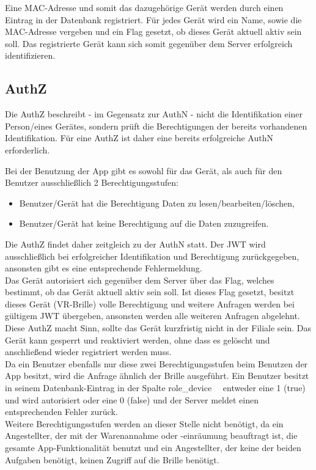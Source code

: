 Eine \ac{MAC}-Adresse und somit das dazugehörige Gerät werden durch einen Eintrag in der Datenbank registriert. Für jedes Gerät wird ein Name, sowie die \ac{MAC}-Adresse vergeben und ein Flag gesetzt, ob dieses Gerät aktuell aktiv sein soll. Das registrierte Gerät kann sich somit gegenüber dem Server erfolgreich identifizieren.

\subsection{\acf{AuthZ}}
Die \acl{AuthZ} beschreibt - im Gegensatz zur \acl{AuthN} - nicht die Identifikation einer Person/eines Gerätes, sondern prüft die Berechtigungen der bereits vorhandenen Identifikation. Für eine \acl{AuthZ} ist daher eine bereits erfolgreiche \acl{AuthN} erforderlich.

Bei der Benutzung der App gibt es sowohl für das Gerät, als auch für den Benutzer ausschließlich 2 Berechtigungsstufen:
\begin{itemize}
	\item Benutzer/Gerät hat die Berechtigung Daten zu lesen/bearbeiten/löschen,
	\item Benutzer/Gerät hat keine Berechtigung auf die Daten zuzugreifen.
\end{itemize}

Die \acl{AuthZ} findet daher zeitgleich zu der \acl{AuthN} statt. Der \ac{JWT} wird ausschließlich bei erfolgreicher Identifikation und Berechtigung zurückgegeben, ansonsten gibt es eine entsprechende Fehlermeldung.\\

Das Gerät autorisiert sich gegenüber dem Server über das Flag, welches bestimmt, ob das Gerät aktuell aktiv sein soll. Ist dieses Flag gesetzt, besitzt dieses Gerät (\zB \acs{VR}-Brille) volle Berechtigung und weitere Anfragen werden bei gültigem \ac{JWT} übergeben, ansonsten werden alle weiteren Anfragen abgelehnt. Diese \acl{AuthZ} macht Sinn, sollte das Gerät kurzfristig nicht in der Filiale sein. Das Gerät kann gesperrt und reaktiviert werden, ohne dass es gelöscht und anschließend wieder registriert werden muss.\\

Da ein Benutzer ebenfalls nur diese zwei Berechtigungsstufen beim Benutzen der App besitzt, wird die Anfrage ähnlich der Brille ausgeführt. Ein Benutzer besitzt in seinem Datenbank-Eintrag in der Spalte \glqq role\_device\grqq~~ entweder eine 1 (true) und wird autorisiert oder eine 0 (false) und der Server meldet einen entsprechenden Fehler zurück.\\

Weitere Berechtigungsstufen werden an dieser Stelle nicht benötigt, da ein Angestellter, der mit der Warenannahme oder -einräumung beauftragt ist, die gesamte App-Funktionalität benutzt und ein Angestellter, der keine der beiden Aufgaben benötigt, keinen Zugriff auf die Brille benötigt.